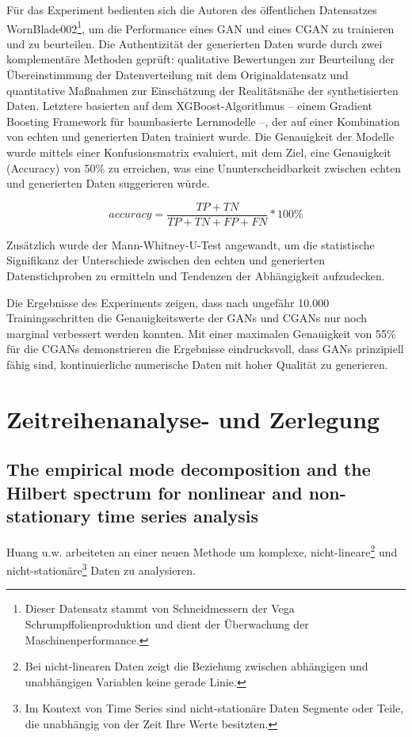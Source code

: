 Für das Experiment bedienten sich die Autoren des öffentlichen Datensatzes
WornBlade002\footnote[1]{Dieser Datensatz stammt von Schneidmessern der Vega
    Schrumpffolienproduktion und dient der Überwachung der Maschinenperformance.}, um die Performance eines GAN und eines CGAN zu trainieren und zu beurteilen.
Die Authentizität der generierten Daten wurde durch zwei komplementäre Methoden geprüft: qualitative Bewertungen zur Beurteilung der Übereinstimmung der
Datenverteilung mit dem Originaldatensatz und quantitative Maßnahmen zur Einschätzung der Realitätsnähe der synthetisierten Daten. Letztere basierten auf
dem XGBoost-Algorithmus – einem Gradient Boosting Framework für baumbasierte Lernmodelle –, der auf einer Kombination von echten und generierten Daten trainiert wurde.
Die Genauigkeit der Modelle wurde mittels einer Konfusionsmatrix evaluiert, mit dem Ziel, eine Genauigkeit (Accuracy) von 50\%
zu erreichen, was eine Ununterscheidbarkeit zwischen echten und generierten Daten suggerieren würde.

\begin{equation}
    accuracy = \frac{TP + TN}{TP + TN + FP + FN} *  100\%
\end{equation}

Zusätzlich wurde der Mann-Whitney-U-Test angewandt, um die statistische Signifikanz der Unterschiede zwischen den echten und generierten
Datenstichproben zu ermitteln und Tendenzen der Abhängigkeit aufzudecken\cite{MannWhit25:online}.

Die Ergebnisse des Experiments zeigen, dass nach ungefähr 10.000 Trainingsschritten die Genauigkeitswerte der GANs und CGANs nur noch marginal
verbessert werden konnten. Mit einer maximalen Genauigkeit von 55\% für die CGANs demonstrieren die Ergebnisse eindrucksvoll, dass
GANs prinzipiell fähig sind, kontinuierliche numerische Daten mit hoher Qualität zu generieren.

\section{Zeitreihenanalyse- und Zerlegung}

\subsection{The empirical mode decomposition and the Hilbert spectrum for nonlinear and non-stationary time series analysis}
Huang u.w.\cite{doi:10.1098/rspa.1998.0193,} arbeiteten an einer neuen Methode um komplexe,
nicht-lineare\footnote{Bei nicht-linearen Daten zeigt die Beziehung zwischen abhängigen und unabhängigen Variablen keine gerade Linie.} und
nicht-stationäre\footnote{Im Kontext von Time Series sind nicht-stationäre Daten Segmente oder Teile, die unabhängig von der Zeit Ihre Werte besitzten.} Daten zu analysieren.


